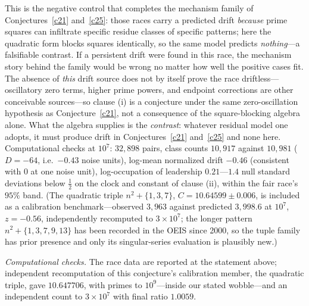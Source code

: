 \documentclass[11pt]{article}
\theoremstyle{definition}
\begin{document}
This is the negative control that completes the mechanism family of
Conjectures~\ref{c21} and~\ref{c25}: those races carry a predicted
drift \emph{because} prime squares can infiltrate specific residue
classes of specific patterns; here the quadratic form blocks squares
identically, so the same model predicts \emph{nothing}---a falsifiable
contrast.  If a persistent drift were found in this race, the
mechanism story behind the family would be wrong no matter how well
the positive cases fit.  The absence of \emph{this} drift source does
not by itself prove the race driftless---oscillatory zero terms,
higher prime powers, and endpoint corrections are other conceivable
sources---so clause (i) is a conjecture under the same
zero-oscillation hypothesis as Conjecture~\ref{c21}, not a
consequence of the square-blocking algebra alone.  What the algebra
supplies is the \emph{contrast}: whatever residual model one adopts,
it must produce drift in Conjectures~\ref{c21} and~\ref{c25} and
none here.  Computational checks at $10^7$: $32{,}898$ pairs,
class counts $10{,}917$ against $10{,}981$
($D=-64$, i.e.\ $-0.43$ noise units), log-mean normalized drift
$-0.46$ (consistent with $0$ at one noise unit), log-occupation of
leadership $0.21$---$1.4$ null standard deviations below $\tfrac12$
on the clock and constant of clause (ii), within the fair race's
$95\%$ band.  (The quadratic triple $n^2+\{1,3,7\}$,
$C=10.64599\pm0.006$, is included as a calibration benchmark---observed
$3{,}963$ against predicted $3{,}998.6$ at $10^7$, $z=-0.56$,
independently recomputed to $3\times10^7$; the longer pattern
$n^2+\{1,3,7,9,13\}$ has been recorded in the OEIS since 2000, so the
tuple family has prior presence and only its singular-series
evaluation is plausibly new.)

\emph{Computational checks.}  The race data are reported at the statement
above; independent recomputation of this conjecture's calibration
member, the quadratic triple, gave $10.647706$, with primes to
$10^9$---inside our stated wobble---and an independent count to
$3\times10^7$ with final ratio $1.0059$.
\end{document}

